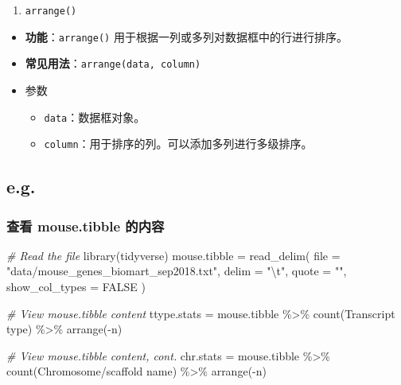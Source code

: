 \documentclass[
]{article}
\newenvironment{Shaded}{}{}
\newcommand{\AttributeTok}[1]{\textcolor[rgb]{0.49,0.56,0.16}{#1}}
\newcommand{\CommentTok}[1]{\textcolor[rgb]{0.38,0.63,0.69}{\textit{#1}}}
\newcommand{\ConstantTok}[1]{\textcolor[rgb]{0.53,0.00,0.00}{#1}}
\newcommand{\FunctionTok}[1]{\textcolor[rgb]{0.02,0.16,0.49}{#1}}
\newcommand{\NormalTok}[1]{#1}
\newcommand{\OtherTok}[1]{\textcolor[rgb]{0.00,0.44,0.13}{#1}}
\newcommand{\SpecialCharTok}[1]{\textcolor[rgb]{0.25,0.44,0.63}{#1}}
\newcommand{\StringTok}[1]{\textcolor[rgb]{0.25,0.44,0.63}{#1}}
\begin{document}
\begin{enumerate}
\def\labelenumi{\arabic{enumi}.}
\item
  \texttt{arrange()}
\end{enumerate}

\begin{itemize}
\item
  \textbf{功能}：\texttt{arrange()}
  用于根据一列或多列对数据框中的行进行排序。
\item
  \textbf{常见用法}：\texttt{arrange(data,\ column)}
\item
  参数

  \begin{itemize}
  \item
    \texttt{data}：数据框对象。
  \item
    \texttt{column}：用于排序的列。可以添加多列进行多级排序。
  \end{itemize}
\end{itemize}

\hypertarget{eg}{%
\subsection{e.g.}\label{eg}}

\hypertarget{ux67e5ux770b-mousetibble-ux7684ux5185ux5bb9}{%
\subsubsection{查看 mouse.tibble
的内容}\label{ux67e5ux770b-mousetibble-ux7684ux5185ux5bb9}}

\begin{Shaded}
\begin{Highlighting}[]
\CommentTok{\# Read the file}
\FunctionTok{library}\NormalTok{(tidyverse)}
\NormalTok{mouse.tibble }\OtherTok{=}
  \FunctionTok{read\_delim}\NormalTok{(}
    \AttributeTok{file =} \StringTok{"data/mouse\_genes\_biomart\_sep2018.txt"}\NormalTok{,}
    \AttributeTok{delim =} \StringTok{"}\SpecialCharTok{\textbackslash{}t}\StringTok{"}\NormalTok{,}
    \AttributeTok{quote =} \StringTok{""}\NormalTok{,}
    \AttributeTok{show\_col\_types =} \ConstantTok{FALSE}
\NormalTok{  )}

\CommentTok{\# View mouse.tibble content}
\NormalTok{ttype.stats }\OtherTok{=}
\NormalTok{  mouse.tibble }\SpecialCharTok{\%\textgreater{}\%}
    \FunctionTok{count}\NormalTok{(}\StringTok{\textasciigrave{}}\AttributeTok{Transcript type}\StringTok{\textasciigrave{}}\NormalTok{) }\SpecialCharTok{\%\textgreater{}\%}
    \FunctionTok{arrange}\NormalTok{(}\SpecialCharTok{{-}}\NormalTok{n)}

\CommentTok{\# View mouse.tibble content, cont.}
\NormalTok{chr.stats }\OtherTok{=}
\NormalTok{  mouse.tibble }\SpecialCharTok{\%\textgreater{}\%}
    \FunctionTok{count}\NormalTok{(}\StringTok{\textasciigrave{}}\AttributeTok{Chromosome/scaffold name}\StringTok{\textasciigrave{}}\NormalTok{) }\SpecialCharTok{\%\textgreater{}\%}
    \FunctionTok{arrange}\NormalTok{(}\SpecialCharTok{{-}}\NormalTok{n)}
\end{Highlighting}
\end{Shaded}
\end{document}
